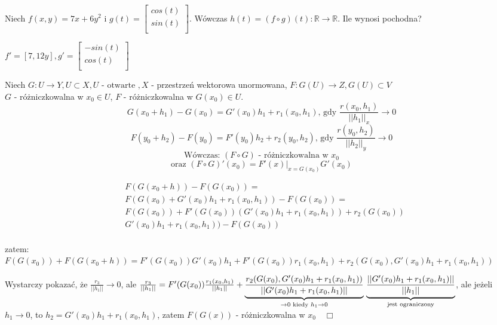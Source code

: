 \documentclass[../main.tex]{subfiles}
\begin{document}
\begin{pytanie}
Niech $f(x,y) = 7x+6y^2 \text{ i } g(t) = \left [ \begin{matrix}
cos(t) \\
sin(t) \\
\end{matrix}\right ]$. Wówczas $h(t) = (f \circ g)(t) : \mathbb{R}\to \mathbb{R}$. Ile wynosi pochodna?
\end{pytanie}

$f' = [7,12y] , g' = \left [ \begin{matrix}
-sin(t)\\
cos(t)\\
\end{matrix}\right ]$

\begin{tw}
Niech $G:U \to Y, U\subset X, U \text{ - otwarte }, X$ - przestrzeń wektorowa unormowana, $F: G(U) \to Z, G(U) \subset V$\\
$G$ - różniczkowalna w $x_0\in U$, $F$ - różniczkowalna w $G(x_0)\in U$.\\
$$G(x_0 + h_1) - G(x_0) = G'(x_0)h_1+r_1(x_0,h_1)\text{, gdy }\frac{r(x_0,h_1)}{||h_1||_x} \to 0$$
$$F(y_0 + h_2) - F(y_0) = F'(y_0)h_2+r_2(y_0,h_2)\text{, gdy }\frac{r(y_0,h_2)}{||h_2||_y} \to 0$$
$$\text{Wówczas: } (F \circ G ) \text{ - różniczkowalna w } x_0$$
$$\text{oraz } (F \circ G)' (x_0) = \left . F'(x)\right |_{x=G(x_0)} G'(x_0)$$
\end{tw}


\begin{dowod}

\end{dowod}

\begin{align*}
    &F(G(x_0 + h)) - F(G(x_0)) =\\
    &F(G(x_0) + G'(x_0)h_1 + r_1(x_0,h_1)) - F(G(x_0)) =\\
    &F(G(x_0)) + F'(G(x_0)) (G'(x_0)h_1 + r_1(x_0,h_1)) + r_2(G(x_0))\\
    &G'(x_0)h_1 + r_1(x_0,h_1)) - F(G(x_0))
\end{align*}\\
zatem:\\
$F(G(x_0))+F(G(x_0+h))=F'(G(x_0))G'(x_0)h_1+F'(G(x_0))r_1(x_0,h_1)+r_2(G(x_0),G'(x_0)h_1+r_1(x_0,h_1))$

Wystarczy pokazać, że $\frac{r_3}{||h_1||}\to 0$, ale $\frac{r_3}{||h_1||} = F'(G(x_0)) \frac{r_1(x_0,h_1)}{||h_1||} +
\underbrace{\frac{r_2(G(x_0),G'(x_0)h_1+r_1(x_0,h_1))}{||G'(x_0)h_1 + r_1(x_0,h_1)||}}_{\to 0 \text{ kiedy } h_1 \to 0}\\
\underbrace{\frac{||G'(x_0)h_1+r_1(x_0,h_1)||}{||h_1||}}_{\text{jest ograniczony}}$, ale jeżeli $h_1\to 0$, to $h_2 = G'(x_0)h_1+r_1(x_0,h_1)$, zatem $F(G(x))$ - różniczkowalna w $x_0 \quad\Box$
\end{document}
